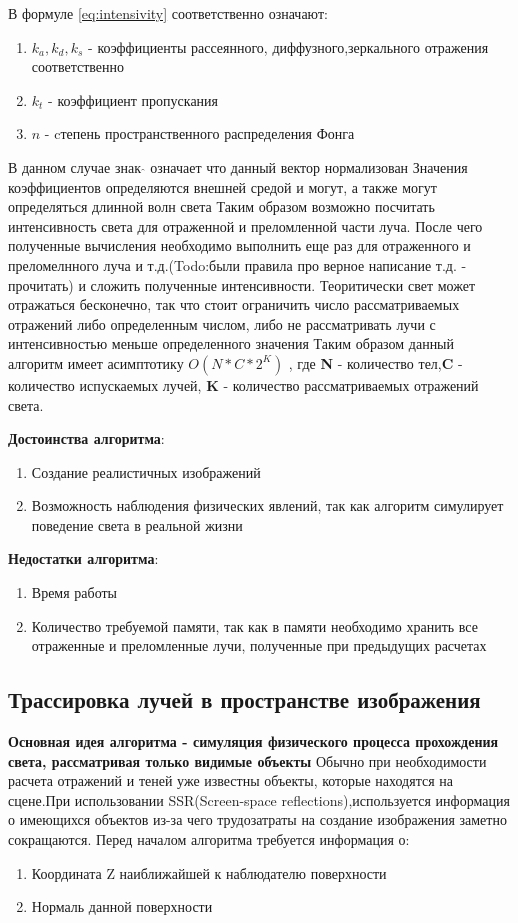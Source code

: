 \documentclass[a4paper,14pt, unknownkeysallowed]{extreport}
\begin{document}
В формуле \ref{eq:intensivity} соответственно означают:
\begin{enumerate}
	\item $k_a,k_d,k_s$ - коэффициенты рассеянного, диффузного,зеркального отражения соответственно
	\item $k_t$ - коэффициент пропускания
	\item $n$ - cтепень пространственного распределения Фонга
\end{enumerate}
В данном случае знак $ \hat{} $  означает что данный вектор нормализован
Значения коэффициентов определяются внешней средой и могут, а также могут определяться длинной волн света
Таким образом возможно посчитать интенсивность света для отраженной и преломленной части луча.
После чего полученные вычисления необходимо выполнить еще раз для отраженного и преломелнного луча и т.д.(Todo:были правила про верное написание т.д. - прочитать)
и сложить полученные интенсивности.
Теоритически свет может отражаться бесконечно, так что стоит ограничить число рассматриваемых отражений либо определенным числом,
либо не рассматривать лучи с интенсивностью меньше определенного значения
Таким образом данный алгоритм имеет асимптотику $O(N*C*2^{K})$ , где \textbf{N} - количество тел,\textbf{C} - количество испускаемых лучей,
\textbf{K} - количество рассматриваемых отражений света. \cite{Rodgers}


\textbf{Достоинства алгоритма}:
\begin{enumerate}
	\item Создание реалистичных изображений
	\item Возможность наблюдения физических явлений, так как алгоритм симулирует поведение света в реальной жизни
\end{enumerate}


\textbf{Недостатки алгоритма}:
\begin{enumerate}
	\item Время работы
	\item Количество требуемой памяти, так как в памяти необходимо хранить все отраженные и преломленные лучи, полученные при предыдущих расчетах
\end{enumerate}


\subsection{Трассировка лучей в пространстве изображения}
\textbf{Основная идея алгоритма - симуляция физического процесса прохождения света, рассматривая только видимые объекты} \newline
Обычно при необходимости расчета отражений и теней уже известны объекты, которые находятся на сцене.При использовании SSR(Screen-space reflections),используется информация о имеющихся
объектов из-за чего трудозатраты на создание изображения заметно сокращаются.
Перед началом алгоритма требуется информация о:
\begin{enumerate}
	\item Координата Z наиближайшей к наблюдателю поверхности
	\item Нормаль данной поверхности
\end{enumerate}
\end{document}
